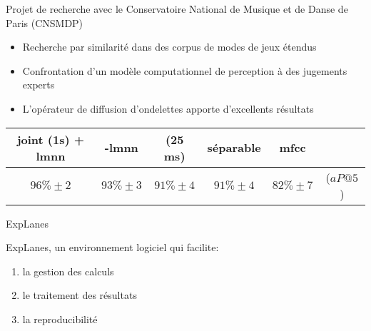 \begin{frame}{Projet de recherche avec le Conservatoire National de Musique et de Danse de Paris (CNSMDP)}
\begin{itemize}
\item Recherche par similarité dans des corpus de modes de jeux étendus
\item Confrontation d'un modèle computationnel de perception à des jugements experts
\item L'opérateur de diffusion d'ondelettes apporte d'excellents résultats
\end{itemize}
\begin{table}
\small
    \centering
{\footnotesize
\begin{tabular}{c|ccccc}
 joint (1s) + lmnn & -lmnn & (25 ms) &  séparable & mfcc & \\
      \hline
 $96\% \pm 2$ & $93\% \pm 3$ & $91\% \pm 4$ & $91\% \pm 4$ & $82\% \pm 7$ & ($aP@5$)\\
\end{tabular}
}
\end{table}
\end{frame}

\begin{frame}{ExpLanes}
  \begin{center}
  \end{center}
  \vspace{.8cm}
ExpLanes, un environnement logiciel qui facilite:
\begin{enumerate}
  \item la gestion des calculs
  \item le traitement des résultats
  \item la reproducibilité
\end{enumerate}
\end{frame}

